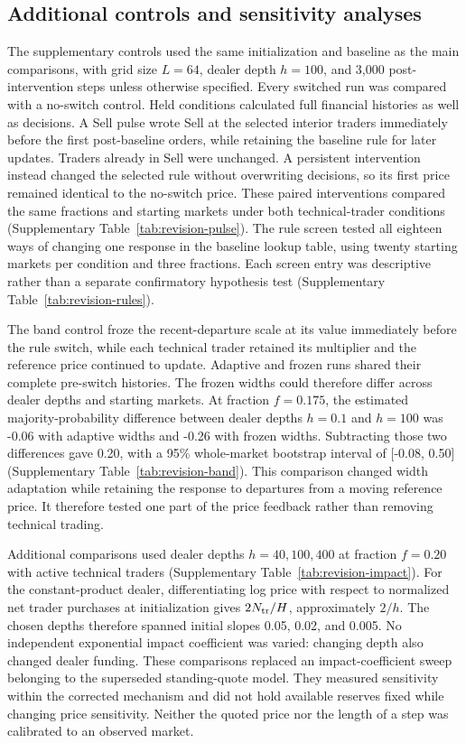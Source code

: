 \subsection{Additional controls and sensitivity analyses}
\label{app:revision-controls}

The supplementary controls used the same initialization and baseline as
the main comparisons, with grid size $L=64$, dealer depth $h=100$, and 3,000 post-intervention
steps unless otherwise specified. Every switched run was compared
with a no-switch control. Held conditions calculated full
financial histories as well as decisions. A Sell pulse wrote Sell
at the selected interior traders immediately before the first post-baseline orders,
while retaining the baseline rule for later updates. Traders already in
Sell were unchanged. A persistent intervention instead changed the
selected rule without overwriting decisions, so its first price remained
identical to the no-switch price. These paired interventions compared
the same fractions and starting markets under both technical-trader
conditions (Supplementary Table~\ref{tab:revision-pulse}). The rule
screen tested all eighteen ways of changing one response in the
baseline lookup table, using twenty starting markets per condition
and three fractions. Each screen entry was descriptive rather
than a separate confirmatory hypothesis test
(Supplementary Table~\ref{tab:revision-rules}).

The band control froze the recent-departure scale at its value immediately
before the rule switch, while each technical trader retained its multiplier
and the reference price continued to update. Adaptive and frozen runs
shared their complete pre-switch histories. The frozen widths could
therefore differ across dealer depths and starting markets. At fraction $f=0.175$,
the estimated majority-probability difference between dealer depths $h=0.1$ and
$h=100$ was -0.06 with adaptive widths and -0.26 with
frozen widths. Subtracting those two differences gave
0.20, with a 95\% whole-market bootstrap interval of
[-0.08, 0.50] (Supplementary Table~\ref{tab:revision-band}).
This comparison changed width adaptation while retaining the response
to departures from a moving reference price. It therefore tested one
part of the price feedback rather than removing technical trading.

Additional comparisons used dealer depths $h=40,100,400$ at fraction $f=0.20$ with
active technical traders (Supplementary Table~\ref{tab:revision-impact}).
For the constant-product dealer, differentiating log price with respect to
normalized net trader purchases at initialization gives $2N_{\rm tr}/H$,
approximately $2/h$. The chosen depths therefore spanned initial slopes
0.05, 0.02, and 0.005. No independent exponential impact coefficient
was varied: changing depth also changed dealer funding. These
comparisons replaced an impact-coefficient sweep belonging to the
superseded standing-quote model. They measured sensitivity within the
corrected mechanism and did not hold available reserves fixed while
changing price sensitivity. Neither the quoted price nor the length of a step was
calibrated to an observed market.

